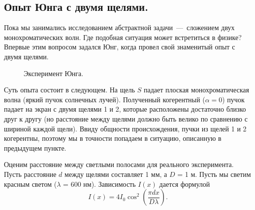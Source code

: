 \documentclass[12pt,a4paper]{article}
\numberwithin{equation}{section}
\numberwithin{equation}{section}
\begin{document}
\subsection{Опыт Юнга с двумя щелями.}

Пока мы занимались исследованием абстрактной задачи~---~сложением двух
монохроматических волн. Где подобная ситуация может встретиться в
физике? Впервые этим вопросом задался Юнг, когда провел свой
знаменитый опыт с двумя щелями.

\begin{figure}[h]
  \centering
  \caption{Эксперимент Юнга.}
  \label{fig:yung}
\end{figure}

Суть опыта состоит в следующем. На щель $S$ падает плоская
монохроматическая волна (яркий пучок солнечных лучей). Полученный
когерентный ($\alpha = 0$) пучок падает на экран с двумя щелями 1 и 2,
которые расположены достаточно близко друг к другу (но расстояние
между щелями должно быть велико по сравнению с шириной каждой
щели). Ввиду общности происхождения, пучки из щелей 1 и 2 когерентны,
поэтому мы в точности попадаем в ситуацию, описанную в предыдущем
пункте.

Оценим расстояние между светлыми полосами для реального
эксперимента. Пусть расстояние $d$ между щелями составляет 1 мм, а $D$
= 1 м. Пусть мы светим красным светом ($\lambda$ = 600
нм). Зависимость $I(x)$ дается формулой
\begin{equation}
I(x) = 4 I_0 \cos^2 \left( \frac{\pi d x}{D \lambda} \right).
\end{equation}
\end{document}
